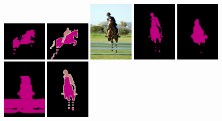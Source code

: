 \begin{figure}
  {\includegraphics[width=0.19\textwidth]{Images/analysis/originalcheckpoint/0262.png}}
  {\includegraphics[width=0.19\textwidth]{Images/analysis/2007_008256.png}}
  {\includegraphics[width=0.19\textwidth]{Images/analysis/0270.jpg}}
  {\includegraphics[width=0.19\textwidth]{Images/analysis/270.png}}
  {\includegraphics[width=0.19\textwidth]{Images/analysis/colored_mask_gi_val270.png}}
{\includegraphics[width=0.19\textwidth]{Images/analysis/originalcheckpoint/0270.png}}
  {\includegraphics[width=0.19\textwidth]{Images/analysis/2007_008596.png}}

\end{figure}
